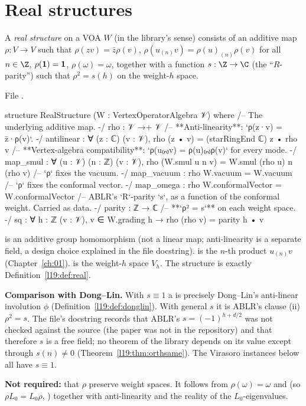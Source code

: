 \section{Real structures}\label{l19:sec:real}

\begin{definition}\label{l19:def:real}
A \emph{real structure} on a VOA $W$ (in the library's sense) consists of an additive map
$\rho:V\to V$ such that $\rho(zv) = \bar z\rho(v)$, $\rho(u_{(n)}v) = \rho(u)_{(n)}\rho(v)$ for all
$n\in\Z$, $\rho(\mathbf{1}) = \mathbf{1}$, $\rho(\omega) = \omega$, together with a function
$s:\Z\to\C$ (the ``$R$-parity'') such that $\rho^2 = s(h)$ on the weight-$h$ space.
\end{definition}

\noindent File .
\begin{leancode}
structure RealStructure (W : VertexOperatorAlgebra 𝒱) where
  /-- The underlying additive map. -/
  rho : 𝒱 →+ 𝒱
  /-- **Anti-linearity**: `ρ(z·v) = z̄·ρ(v)`. -/
  antilinear : ∀ (z : ℂ) (v : 𝒱), rho (z • v) = (starRingEnd ℂ) z • rho v
  /-- **Vertex-algebra compatibility**: `ρ(u₍ₙ₎v) = ρ(u)₍ₙ₎ρ(v)` for every mode. -/
  map_smul : ∀ (u : 𝒱) (n : ℤ) (v : 𝒱), rho (W.smul u n v) = W.smul (rho u) n (rho v)
  /-- `ρ` fixes the vacuum. -/
  map_vacuum : rho W.vacuum = W.vacuum
  /-- `ρ` fixes the conformal vector. -/
  map_omega : rho W.conformalVector = W.conformalVector
  /-- ABLR's `R`-parity `s`, as a function of the conformal weight.  Carried as data. -/
  parity : ℤ → ℂ
  /-- **`ρ² = s`** on each weight space. -/
  sq : ∀ {h : ℤ} (v : 𝒱), v ∈ W.grading h → rho (rho v) = parity h • v
\end{leancode}

\begin{dictionary}
 is an additive group homomorphism (not a linear map; anti-linearity is a separate
field, a design choice explained in the file docstring).  is the $n$-th product
$u_{(n)}v$ (Chapter~\ref{ch:01}).  is the weight-$h$ space $V_h$. The structure is
exactly Definition~\ref{l19:def:real}.

\textbf{Comparison with Dong--Lin.} With $s\equiv1$ a  is precisely Dong--Lin's
anti-linear involution $\phi$ (Definition~\ref{l19:def:donglin}). With general $s$ it is ABLR's
clause (ii) $\rho^2 = s$. The file's docstring records that ABLR's $s = (-1)^{h+d/2}$ was not checked
against the source (the paper was not in the repository) and that therefore $s$ is a free field; no
theorem of the library depends on its value except through $s(n)\ne0$
(Theorem~\ref{l19:thm:orthsame}). The Virasoro instances below all have $s\equiv1$.

\textbf{Not required:} that $\rho$ preserve weight spaces. It follows from $\rho(\omega)=\omega$
and  (so $\rho L_0 = L_0\rho$, ) together with
anti-linearity and the reality of the $L_0$-eigenvalues.
\end{dictionary}

